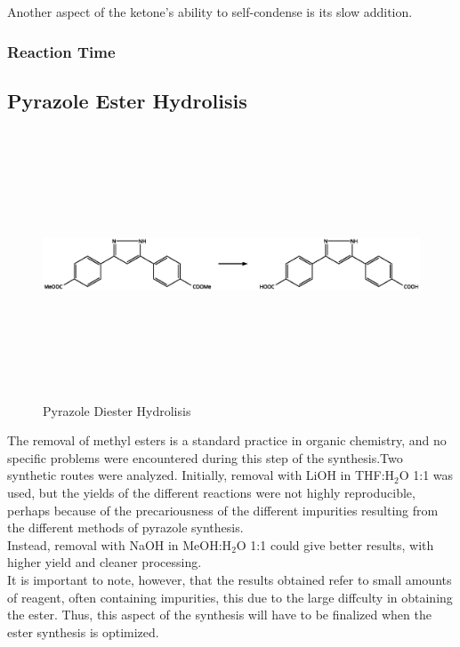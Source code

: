 \documentclass[../Master.tex]{subfiles}
\begin{document}
Another aspect of the ketone's ability to self-condense is its slow addition.

\subsubsection{Reaction Time}


\subsection{Pyrazole Ester Hydrolisis}\label{sec:pyrazole-hydro}

\begin{figure}[h!]
	\centering
	\includegraphics[width=13cm,height=8cm,keepaspectratio]{Structures/pyrazole-hydro.eps}
	\caption{Pyrazole Diester Hydrolisis}\label{fig:pyrazole-form}
\end{figure}

The removal of methyl esters is a standard practice in organic chemistry, and no specific problems were encountered during this step of the synthesis.Two synthetic routes were analyzed.
Initially, removal with LiOH in THF:H$_2$O 1:1 was used, but the yields of the different reactions were not highly reproducible, perhaps because of the precariousness of the different impurities resulting from the different methods of pyrazole synthesis. \\
Instead, removal with NaOH in MeOH:H$_{2}$O 1:1 could give better results, with higher yield and cleaner processing. \\
It is important to note, however, that the results obtained refer to small amounts of reagent, often containing impurities, this due to the large diffculty in obtaining the ester. Thus, this aspect of the synthesis will have to be finalized when the ester synthesis is optimized.
\end{document}
